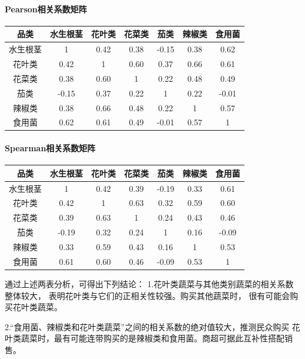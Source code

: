 \documentclass{cumcmthesis}
\begin{document}
\paragraph{Pearson相关系数矩阵}
\begin{table}[H]
\centering
\begin{tabular}{c c c c c c c}
\toprule
品类 & 水生根茎 & 花叶类 & 花菜类 & 茄类 & 辣椒类 & 食用菌 \\
\midrule
水生根茎 & 1 & 0.42 & 0.38 & -0.15 & 0.38 & 0.62 \\
花叶类 & 0.42 & 1 & 0.60 & 0.37 & 0.66 & 0.61 \\
花菜类 & 0.38 & 0.60 & 1 & 0.22 & 0.48 & 0.49 \\
茄类 & -0.15 & 0.37 & 0.22 & 1 & 0.22 & -0.01 \\
辣椒类 & 0.38 & 0.66 & 0.48 & 0.22 & 1 & 0.57 \\
食用菌 & 0.62 & 0.61 & 0.49 & -0.01 & 0.57 & 1 \\
\bottomrule
\end{tabular}
\end{table}

\paragraph{Spearman相关系数矩阵}
\begin{table}[H]
\centering
\begin{tabular}{c c c c c c c}
\toprule
品类 & 水生根茎 & 花叶类 & 花菜类 & 茄类 & 辣椒类 & 食用菌 \\
\midrule
水生根茎 & 1 & 0.42 & 0.39 & -0.19 & 0.33 & 0.61 \\
花叶类 & 0.42 & 1 & 0.63 & 0.32 & 0.59 & 0.60 \\
花菜类 & 0.39 & 0.63 & 1 & 0.24 & 0.43 & 0.46 \\
茄类 & -0.19 & 0.32 & 0.24 & 1 & 0.16 & -0.09 \\
辣椒类 & 0.33 & 0.59 & 0.43 & 0.16 & 1 & 0.53 \\
食用菌 & 0.61 & 0.60 & 0.46 & -0.09 & 0.53 & 1 \\
\bottomrule
\end{tabular}
\end{table}

通过上述两表分析，可得出下列结论：
1.花叶类蔬菜与其他类别蔬菜的相关系数整体较大，
表明花叶类与它们的正相关性较强。购买其他蔬菜时，
很有可能会购买花叶类蔬菜。

2.“食用菌、辣椒类和花叶类蔬菜”之间的相关系数的绝对值较大，推测民众购买
花叶类蔬菜时，最有可能连带购买的是辣椒类和食用菌。商超可据此互补性搭配销售。
\end{document}
